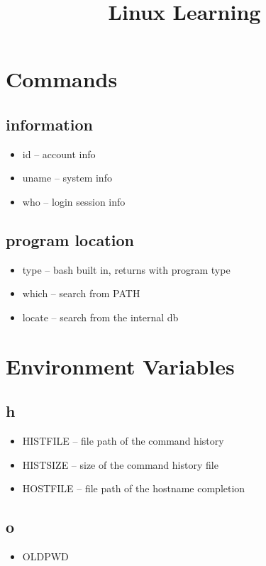 \documentclass[titlepage]{article}
\begin{document}
	\title{Linux Learning}
	\maketitle
	
	\section{Commands}
	  \subsection{information}
	    \begin{itemize}
	    	\item id -- account info
	    	\item uname -- system info
	    	\item who -- login session info
	    \end{itemize}
    
      \subsection{program location}
        \begin{itemize}
        	\item type -- bash built in, returns with program type
        	\item which -- search from PATH
        	\item locate -- search from the internal db
        \end{itemize}
    
    \section{Environment Variables}
      \subsection{h}
        \begin{itemize}
        	\item HISTFILE -- file path of the command history
        	\item HISTSIZE -- size of the command history file
        	\item HOSTFILE -- file path of the hostname completion
        \end{itemize}
      \subsection{o}
        \begin{itemize}
        	\item OLDPWD
        \end{itemize}
\end{document}
